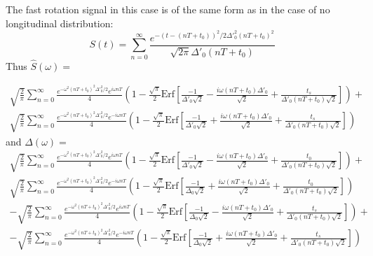 The fast rotation signal in this case is of the same form as in the case of no longitudinal distribution: \[S(t)=\sum^{\infty}_{n=0}\frac{e^{-(t-(nT+t_0))^2/2\Delta'^2_0(nT+t_0)^2}}{\sqrt{2\pi}\Delta'_0(nT+t_0)}\] Thus $\hat{S}(\omega)=$ 

\begin{gather}
\sqrt{\frac{2}{\pi}}\sum^{\infty}_{n=0}\frac{e^{-\omega^2(nT+t_0)^2\Delta'^2_0/2}e^{i\omega nT}}{4}\left(1-\frac{\sqrt{\pi}}{2}\text{Erf}\left[\frac{-1}{\Delta'_0\sqrt{2}}-\frac{i\omega (nT+t_0)\Delta'_0}{\sqrt{2}}+\frac{t_s}{\Delta'_0(nT+t_0)\sqrt{2}}\right]\right)+ \nonumber \\
\sqrt{\frac{2}{\pi}}\sum^{\infty}_{n=0}\frac{e^{-\omega^2(nT+t_0)^2\Delta'^2_0/2}e^{-i\omega nT}}{4}\left(1-\frac{\sqrt{\pi}}{2}\text{Erf}\left[\frac{-1}{\Delta'_0\sqrt{2}}+\frac{i\omega (nT+t_0)\Delta'_0}{\sqrt{2}}+\frac{t_s}{\Delta'_0(nT+t_0)\sqrt{2}}\right]\right)
\end{gather}
and $\Delta(\omega)=$
\begin{gather}
\sqrt{\frac{2}{\pi}}\sum^{\infty}_{n=0}\frac{e^{-\omega^2(nT+t_0)^2\Delta'^2_0/2}e^{i\omega nT}}{4}\left(1-\frac{\sqrt{\pi}}{2}\text{Erf}\left[\frac{-1}{\Delta'_0\sqrt{2}}-\frac{i\omega (nT+t_0)\Delta'_0}{\sqrt{2}}+\frac{t_0}{\Delta'_0(nT+t_0)\sqrt{2}}\right]\right)+ \nonumber \\
\sqrt{\frac{2}{\pi}}\sum^{\infty}_{n=0}\frac{e^{-\omega^2(nT+t_0)^2\Delta'^2_0/2}e^{-i\omega nT}}{4}\left(1-\frac{\sqrt{\pi}}{2}\text{Erf}\left[\frac{-1}{\Delta_0\sqrt{2}}+\frac{i\omega (nT+t_0)\Delta'_0}{\sqrt{2}}+\frac{t_0}{\Delta'_0(nT+t_0)\sqrt{2}}\right]\right) \nonumber \\
-\sqrt{\frac{2}{\pi}}\sum^{\infty}_{n=0}\frac{e^{-\omega^2(nT+t_0)^2\Delta'^2_0/2}e^{i\omega nT}}{4}\left(1-\frac{\sqrt{\pi}}{2}\text{Erf}\left[\frac{-1}{\Delta_0\sqrt{2}}-\frac{i\omega (nT+t_0)\Delta'_0}{\sqrt{2}}+\frac{t_s}{\Delta'_0(nT+t_0)\sqrt{2}}\right]\right)+ \nonumber \\
-\sqrt{\frac{2}{\pi}}\sum^{\infty}_{n=0}\frac{e^{-\omega^2(nT+t_0)^2\Delta'^2_0/2}e^{-i\omega nT}}{4}\left(1-\frac{\sqrt{\pi}}{2}\text{Erf}\left[\frac{-1}{\Delta_0\sqrt{2}}+\frac{i\omega (nT+t_0)\Delta'_0}{\sqrt{2}}+\frac{t_s}{\Delta'_0(nT+t_0)\sqrt{2}}\right]\right)
\end{gather}

